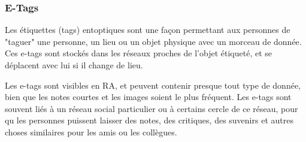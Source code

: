 \subsubsection{E-Tags} 

Les étiquettes (tags) entoptiques sont une façon permettant aux personnes de "taguer" une personne, un lieu ou un objet physique avec un morceau de donnée. Ces e-tags sont stockés dans les réseaux proches de l'objet étiqueté, et se déplacent avec lui si il change de lieu. 

Les e-tags sont visibles en RA, et peuvent contenir presque tout type de donnée, bien que les notes courtes et les images soient le plus fréquent. Les e-tags sont souvent liés à un réseau social particulier ou à certains cercle de ce réseau, pour qu les personnes puissent laisser des notes, des critiques, des suvenirs et autres choses similaires pour les amis ou les collègues. 



